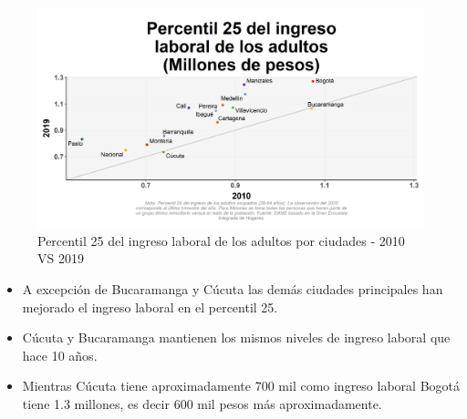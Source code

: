     \begin{figure}[H]
        \caption{Percentil 25 del ingreso laboral de los adultos por ciudades - 2010 VS 2019 \label{map_result_2} }
        \begin{center}
        \includegraphics[width=\textwidth,keepaspectratio]{img/var_7_scatter_time.png}
        \end{center}
    \end{figure}
            \begin{itemize}
                \item A excepción de Bucaramanga y Cúcuta las demás ciudades principales han mejorado el ingreso laboral en el percentil 25.
                \item Cúcuta y Bucaramanga mantienen los mismos niveles de ingreso laboral que hace 10 años.
                \item Mientras Cúcuta tiene aproximadamente 700 mil como ingreso laboral Bogotá tiene 1.3 millones, es decir 600 mil pesos más aproximadamente.
                \end{itemize}

